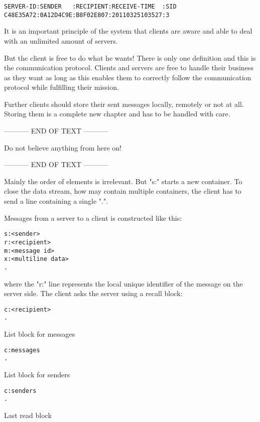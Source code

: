 \documentclass[twoside,a4paper,english,12pt,authoryear,openright]{book}
\begin{document}
\begin{lstlisting}
SERVER-ID:SENDER   :RECIPIENT:RECEIVE-TIME  :SID
C48E35A72:0A12D4C9E:B8F02E807:20110325103527:3
\end{lstlisting}

It is an important principle of the system that clients are aware and able to deal with an unlimited amount of servers.

But the client is free to do what he wants! There is only one definition and this is the communication protocol. Clients and servers are free to handle their business as they want as long as this enables them to correctly follow the communication protocol while fulfilling their mission.

Further clients should store their sent messages locally, remotely or not at all. Storing them is a complete new chapter and has to be handled with care.



----------- END OF TEXT -----------

Do not believe anything from here on!

----------- END OF TEXT -----------

Mainly the order of elements is irrelevant. But "s:" starts a new container. To close the data stream, how may contain multiple containers, the client has to send a line containing a single ".".

Messages from a server to a client is constructed like this:

\begin{lstlisting}
s:<sender>
r:<recipient>
m:<message id>
x:<multiline data>
.
\end{lstlisting}

where the "r:" line represents the local unique identifier of the message on the server side. The client asks the server using a recall block:

\begin{lstlisting}
c:<recipient>
.
\end{lstlisting}

List block for messages

\begin{lstlisting}
c:messages
.
\end{lstlisting}

List block for senders

\begin{lstlisting}
c:senders
.
\end{lstlisting}

Last read block
\end{document}

